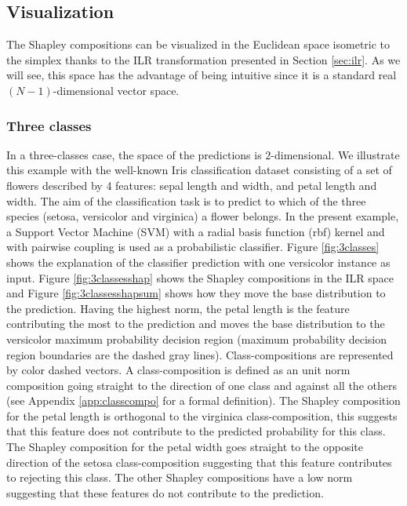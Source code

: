 \documentclass{article}
\theoremstyle{plain}
\theoremstyle{definition}
\theoremstyle{remark}
\begin{document}
\subsection{Visualization}

The Shapley compositions can be visualized in the Euclidean space isometric to the simplex thanks to the ILR transformation presented in Section \ref{sec:ilr}. As we will see, this space has the advantage of being intuitive since it is a standard real $(N-1)$-dimensional vector space.

\subsubsection{Three classes}

In a three-classes case, the space of the predictions is $2$-dimensional. We illustrate this example with the well-known Iris classification dataset consisting of a set of flowers described by 4 features: sepal length and width, and petal length and width. The aim of the classification task is to predict to which of the three species (setosa, versicolor and virginica) a flower belongs. In the present example, a Support Vector Machine (SVM) with a radial basis function (rbf) kernel and with pairwise coupling \cite{wu2003probability} is used as a probabilistic classifier. Figure \ref{fig:3classes} shows the explanation of the classifier prediction with one versicolor instance as input. Figure \ref{fig:3classesshap} shows the Shapley compositions in the ILR space and Figure \ref{fig:3classesshapsum} shows how they move the base distribution to the prediction. Having the highest norm, the petal length is the feature contributing the most to the prediction and moves the base distribution to the versicolor maximum probability decision region (maximum probability decision region boundaries are the dashed gray lines). Class-compositions are represented by color dashed vectors. A class-composition is defined as an unit norm composition going straight to the direction of one class and against all the others (see Appendix \ref{app:classcompo} for a formal definition). The Shapley composition for the petal length is orthogonal to the virginica class-composition, this suggests that this feature does not contribute to the predicted probability for this class. The Shapley composition for the petal width goes straight to the opposite direction of the setosa class-composition suggesting that this feature contributes to rejecting this class. The other Shapley compositions have a low norm suggesting that these features do not contribute to the prediction.
\end{document}
